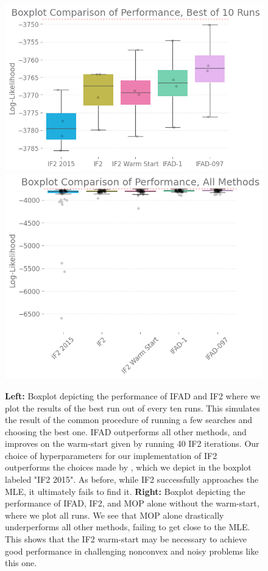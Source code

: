 \documentclass{article}
\begin{document}
\begin{figure}[ht]
    \centering
    \includegraphics[scale=0.48]{../imgs/095/boxplot.png}
    \includegraphics[scale=0.53]{../imgs/095/boxplotall.png}
    \caption{\textbf{Left:} Boxplot depicting the performance of IFAD and IF2 where we plot the results of the best run out of every ten runs. This simulates the result of the common procedure of running a few searches and choosing the best one. IFAD outperforms all other methods, and improves on the warm-start given by running 40 IF2 iterations. Our choice of hyperparameters for our implementation of IF2 outperforms the choices made by \cite{ionides15}, which we depict in the boxplot labeled "IF2 2015". As before, while IF2 successfully approaches the MLE, it ultimately fails to find it.
    \textbf{Right:} Boxplot depicting the performance of IFAD, IF2, and MOP alone without the warm-start, where we plot all runs. We see that MOP alone drastically underperforms all other methods, failing to get close to the MLE. This shows that the IF2 warm-start may be necessary to achieve good performance in challenging nonconvex and noisy problems like this one.
}
\end{figure}
\end{document}
